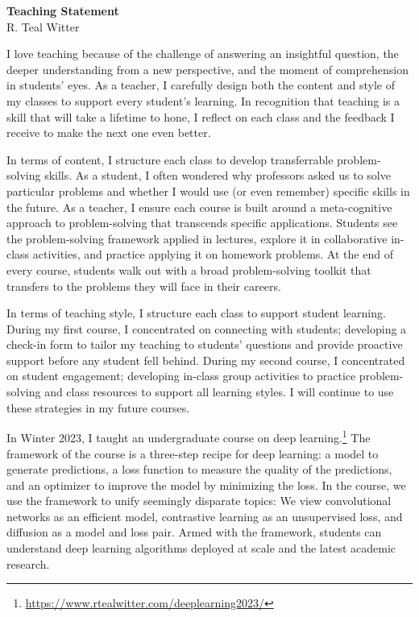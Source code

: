 \documentclass[11pt]{article}
\begin{document}
\begin{center}
	\Large \textbf{Teaching Statement} \\
	\vspace{.25em}
	\large{R. {\color{teal}Teal} Witter}
\end{center}

I love teaching because of the challenge of answering an insightful question, the deeper understanding from a new perspective, and the moment of comprehension in students' eyes.
As a teacher, I carefully design both the content and style of my classes to support every student's learning.
In recognition that teaching is a skill that will take a lifetime to hone, I reflect on each class and the feedback I receive to make the next one even better. 

In terms of content, I structure each class to develop transferrable problem-solving skills.
As a student, I often wondered why professors asked us to solve particular problems and whether I would use (or even remember) specific skills in the future.
As a teacher, I ensure each course is built around a meta-cognitive approach to problem-solving that transcends specific applications.
Students see the problem-solving framework applied in lectures, explore it in collaborative in-class activities, and practice applying it on homework problems.
At the end of every course, students walk out with a broad problem-solving toolkit that transfers to the problems they will face in their careers.

In terms of teaching style, I structure each class to support student learning.
During my first course, I concentrated on connecting with students; developing a check-in form to tailor my teaching to students' questions and provide proactive support before any student fell behind.
During my second course, I concentrated on student engagement; developing in-class group activities to practice problem-solving and class resources to support all learning styles.
I will continue to use these strategies in my future courses.


In Winter 2023, I taught an undergraduate course on deep learning.\footnote{\url{https://www.rtealwitter.com/deeplearning2023/}}
The framework of the course is a three-step recipe for deep learning: a model to generate predictions, a loss function to measure the quality of the predictions, and an optimizer to improve the model by minimizing the loss.
In the course, we use the framework to unify seemingly disparate topics:
We view convolutional networks as an efficient model, contrastive learning as an unsupervised loss, and diffusion as a model and loss pair.
Armed with the framework, students can understand deep learning algorithms deployed at scale and the latest academic research.
\end{document}
